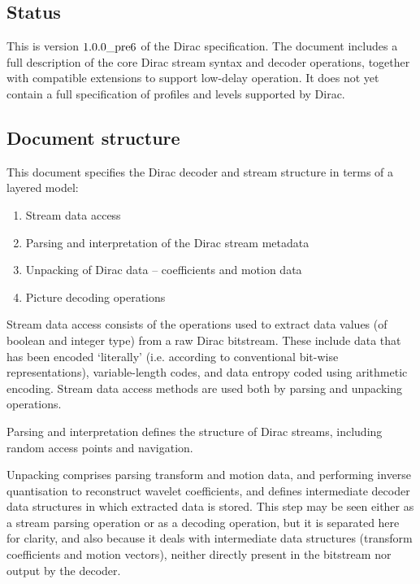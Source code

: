 \subsection{Status}
\label{introstatus}

This is version $\text{1.0.0\_pre6}$ of the Dirac specification. The document includes
a full description of the core Dirac stream syntax and decoder operations, together
with compatible extensions to support low-delay operation. It does
not yet contain a full specification of profiles and levels supported by Dirac.

\subsection{Document structure}
\label{introdocstruct}

This document specifies the Dirac decoder and stream structure in terms of
a layered model:

\begin{enumerate}
    \item Stream data access
    \item Parsing and interpretation of the Dirac stream metadata
    \item Unpacking of Dirac data -- coefficients and motion data
    \item Picture decoding operations
\end{enumerate}

Stream data access consists of the operations used to extract data values
(of boolean and integer type) from a raw Dirac bitstream. These include
data that has been encoded `literally' (i.e. according to conventional bit-wise
representations), variable-length codes, and data entropy coded using arithmetic
encoding. Stream data access methods are used both by parsing and unpacking operations.

Parsing and interpretation defines the structure of Dirac streams, including
random access points and navigation. 

Unpacking comprises parsing transform and motion data, and performing
inverse quantisation to reconstruct wavelet coefficients, and defines
intermediate decoder data structures in which extracted data is stored. This
step may be seen either as a stream parsing operation or as a decoding
operation, but it is separated here for clarity, and also because it
deals with intermediate data structures (transform coefficients and motion vectors), 
neither directly present in the bitstream nor output by the decoder.

